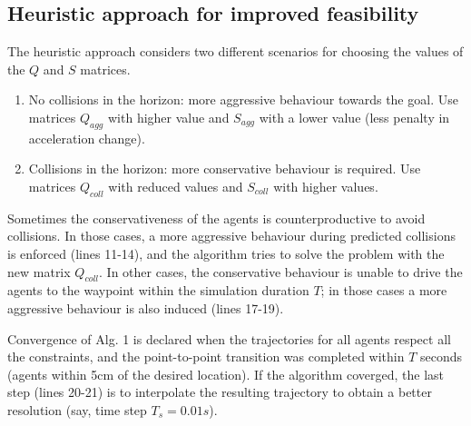\subsection{Heuristic approach for improved feasibility}
The heuristic approach considers two different scenarios for choosing the values of the $Q$ and $S$ matrices.
\begin{enumerate}
	\item No collisions in the horizon: more aggressive behaviour towards the goal. Use matrices $Q_{agg}$ with higher value and $S_{agg}$ with a lower value (less penalty in acceleration change).
	\item Collisions in the horizon: more conservative behaviour is required. Use matrices $Q_{coll}$ with reduced values and $S_{coll}$ with higher values.
\end{enumerate}

Sometimes the conservativeness of the agents is counterproductive to avoid collisions. In those cases, a more aggressive behaviour during predicted collisions is enforced (lines 11-14), and the algorithm tries to solve the problem with the new matrix $Q_{coll}$. In other cases, the conservative behaviour is unable to drive the agents to the waypoint within the simulation duration $T$; in those cases a more aggressive behaviour is also induced (lines 17-19). 

Convergence of Alg. 1 is declared when the trajectories for all agents respect all the constraints, and the point-to-point transition was completed within $T$ seconds (agents within 5cm of the desired location). If the algorithm coverged, the last step (lines 20-21) is to interpolate the resulting trajectory to obtain a better resolution (say, time step $T_s = 0.01s$).